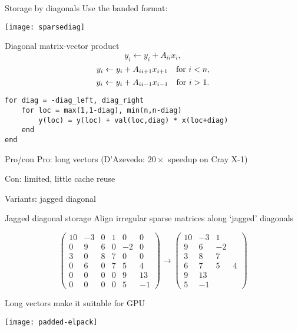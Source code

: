 \begin{diagonalstorage}
  \begin{frame}{Storage by diagonals}
    Use the banded format:

    \texttt{[image: sparsediag]}
  \end{frame}

  \begin{frame}[fragile]{Diagonal matrix-vector product}
    \[ y_i \leftarrow y_i + A_{ii} x_i, \]
    \[ y_i \leftarrow y_i + A_{ii+1} x_{i+1}\quad\hbox{for $i<n$}, \]
    \[ y_i \leftarrow y_i + A_{ii-1} x_{i-1}\quad\hbox{for $i>1$}. \]

\begin{verbatim}
for diag = -diag_left, diag_right
    for loc = max(1,1-diag), min(n,n-diag)
        y(loc) = y(loc) + val(loc,diag) * x(loc+diag)
    end
end
\end{verbatim}
  \end{frame}

  \begin{frame}{Pro/con}
    Pro: long vectors (D'Azevedo: $20\times$ speedup on Cray X-1)

    Con: limited, little cache reuse

    Variants: jagged diagonal
  \end{frame}

  \begin{frame}{Jagged diagonal storage}
    Align irregular sparse matrices along `jagged' diagonals

    \[
    \begin{pmatrix}
      10&-3&0&1&0&0\\ 0&9&6&0&-2&0\\ 3&0&8&7&0&0\\
      0&6&0&7&5&4\\ 0&0&0&0&9&13\\ 0&0&0&0&5&-1
    \end{pmatrix}
    \rightarrow
    \begin{pmatrix}
      10&-3&1\\ 9&6&-2\\ 3&8&7\\
      6&7&5&4\\ 9&13\\ 5&-1
    \end{pmatrix}
    \]
  \end{frame}

  \begin{frame}
    Long vectors make it suitable for GPU

    \texttt{[image: padded-elpack]}
  \end{frame}
\end{diagonalstorage}


